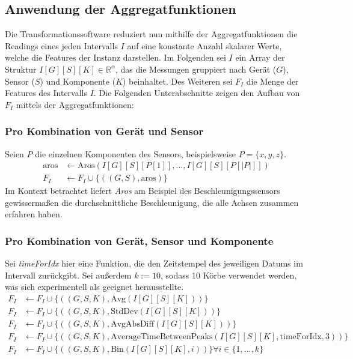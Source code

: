 \subsection{Anwendung der Aggregatfunktionen}
Die Transformationssoftware reduziert nun mithilfe der Aggregatfunktionen die Readings eines jeden Intervalls $I$ auf eine konstante Anzahl skalarer Werte, welche die Features der Instanz darstellen. Im Folgenden sei $I$ ein Array der Struktur $I[G][S][K] \in \mathbb{R}^\alpha$, das die Messungen gruppiert nach Gerät ($G$), Sensor ($S$) und Komponente ($K$) beinhaltet. Des Weiteren sei $F_I$ die Menge der Features des Intervalls $I$. Die Folgenden Unterabschnitte zeigen den Aufbau von $F_I$ mittels der Aggregatfunktionen:
\subsubsection{Pro Kombination von Gerät und Sensor}
Seien $P$ die einzelnen Komponenten des Sensors, beispielsweise $P = \{x, y, z\}$.
\begin{align}
    \text{aros} &\gets \text{Aros}(I[G][S][P[1]], ..., I[G][S][P[|P|]]) \\
    F_I &\gets F_I \cup \{((G, S), \text{aros})\}
\end{align}
Im Kontext betrachtet liefert \textit{Aros} am Beispiel des Beschleunigungssensors gewissermaßen die durchschnittliche Beschleunigung, die alle Achsen zusammen erfahren haben.
\subsubsection{Pro Kombination von Gerät, Sensor und Komponente}
Sei \textit{timeForIdx} hier eine Funktion, die den Zeitstempel des jeweiligen Datums im Intervall zurückgibt. Sei außerdem $k := 10$, sodass 10 Körbe verwendet werden, was sich experimentell als geeignet herausstellte.
\begin{align}
    F_I &\gets F_I \cup \{((G, S, K), \text{Avg}(I[G][S][K]))\} \\
    F_I &\gets F_I \cup \{((G, S, K), \text{StdDev}(I[G][S][K]))\} \\
    F_I &\gets F_I \cup \{((G, S, K), \text{AvgAbsDiff}(I[G][S][K]))\} \\
    F_I &\gets F_I \cup \{((G, S, K), \text{AverageTimeBetweenPeaks}(I[G][S][K], \text{timeForIdx}, 3))\} \\
    F_I &\gets F_I \cup \{((G, S, K), \text{Bin}(I[G][S][K], i))\} \forall i \in \{1, ..., k\}
\end{align}

